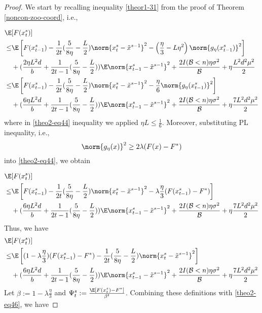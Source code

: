 \begin{proof}
We start by recalling inequality \eqref{theor1-31} from the proof of Theorem \ref{noncon-zoo-coord}, i.e.,

\begin{align} 
\E&[F({x}_{t}^s)] \notag
\\ \leq& \E\left[F({x}_{t-1}^s)  -\frac{1}{2t}(\frac{5}{8\eta} - \frac{L}{2})\norm{{x}_t^s-\tilde{x}^{s-1}}^2- \left(\frac{\eta}{3}-L\eta^2\right)\norm{g_{\eta}(x_{t-1}^s)}^2\right]\notag\\
&+(\frac{2\eta L^2 d}{b}+\frac{1}{2t-1}(\frac{5}{8\eta} - \frac{L}{2}))\E\norm{x_{t-1}^s-\tilde{x}^{s-1}}^2
+ \frac{2I(\mathcal{B} < n)\eta \sigma ^2}{\mathcal{B}}+\eta \frac{L^2 d^2 \mu^2}{2}\notag
\\ \leq& \E\left[F({x}_{t-1}^s)  -\frac{1}{2t}(\frac{5}{8\eta} - \frac{L}{2})\norm{{x}_t^s-\tilde{x}^{s-1}}^2- \frac{\eta}{6}\norm{g_{\eta}(x_{t-1}^s)}^2\right]\notag\\
&+(\frac{6\eta L^2 d}{b}+\frac{1}{2t-1}(\frac{5}{8\eta} - \frac{L}{2}))\E\norm{x_{t-1}^s-\tilde{x}^{s-1}}^2
+ \frac{2I(\mathcal{B} < n)\eta \sigma ^2}{\mathcal{B}}+\eta \frac{7 L^2 d^2 \mu^2}{2}\label{theo2-eq44}
 \end{align}
 where in \eqref{theo2-eq44} inequality we applied $\eta L \leq \frac{1}{6}$.
Moreover, substituting PL inequality, i.e., 
\begin{equation}
\norm{g_{\eta}(x)}^2 \geq 2\lambda (F(x) - F^*)
\end{equation}
into \eqref{theo2-eq44}, we obtain

\begin{align} 
\E&[F({x}_{t}^s)] \notag
\\ \leq& \E\left[F({x}_{t-1}^s)  -\frac{1}{2t}(\frac{5}{8\eta} - \frac{L}{2})\norm{{x}_t^s-\tilde{x}^{s-1}}^2- \lambda\frac{\eta}{3}(F({x}_{t-1}^s) - F^*) \right]\notag\\
&+(\frac{6\eta L^2 d}{b}+\frac{1}{2t-1}(\frac{5}{8\eta} - \frac{L}{2}))\E\norm{x_{t-1}^s-\tilde{x}^{s-1}}^2
+ \frac{2I(\mathcal{B} < n)\eta \sigma ^2}{\mathcal{B}}+\eta \frac{7 L^2 d^2 \mu^2}{2}
 \end{align}
Thus, we have
\begin{align} 
\E&[F({x}_{t}^s)] \notag
\\ \leq& \E\left[ (1-\lambda\frac{\eta}{3})(F({x}_{t-1}^s) - F^*)   -\frac{1}{2t}(\frac{5}{8\eta} - \frac{L}{2})\norm{{x}_t^s-\tilde{x}^{s-1}}^2\right]\notag\\
&+(\frac{6 \eta L^2 d}{b}+\frac{1}{2t-1}(\frac{5}{8\eta} - \frac{L}{2}))\E\norm{x_{t-1}^s-\tilde{x}^{s-1}}^2
+ \frac{2I(\mathcal{B} < n)\eta \sigma ^2}{\mathcal{B}}+\eta \frac{7 L^2 d^2 \mu^2}{2}\label{theo2-eq46}
 \end{align}
Let $\beta := 1 - \lambda\frac{\eta}{3}$ and $\Psi_t^s := \frac{\E[F({x}_{t}^s)-F^*]}{\beta^t}$. Combining these definitions with \eqref{theo2-eq46}, we have  


\end{proof}
